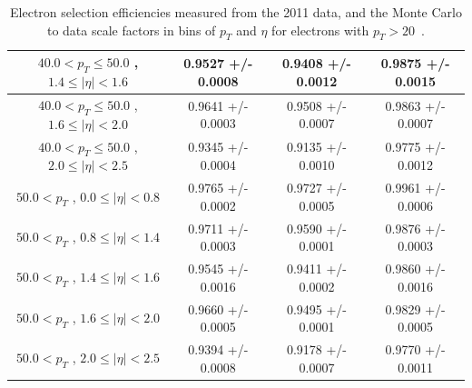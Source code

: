 \documentclass{cmspaper}
\begin{document}
\begin{table}[!ht]
\begin{center}
\begin{tabular}{|c|c|c|c|}
\hline
$ 40.0 < p_{T} \le  50.0$ , $  1.4  \le |\eta| <   1.6$   &       0.9527 +/- 0.0008   &       0.9408 +/- 0.0012   &       0.9875 +/- 0.0015   \\   
\hline
$ 40.0 < p_{T} \le  50.0$ , $  1.6  \le |\eta| <   2.0$   &       0.9641 +/- 0.0003   &       0.9508 +/- 0.0007   &       0.9863 +/- 0.0007   \\   
\hline
$ 40.0 < p_{T} \le  50.0$ , $  2.0  \le |\eta| <   2.5$   &       0.9345 +/- 0.0004   &       0.9135 +/- 0.0010   &       0.9775 +/- 0.0012   \\   
\hline
$ 50.0 < p_{T} $ , $  0.0  \le |\eta| <   0.8$   &       0.9765 +/- 0.0002   &       0.9727 +/- 0.0005   &       0.9961 +/- 0.0006   \\   
\hline
$ 50.0 < p_{T} $ , $  0.8  \le |\eta| <   1.4$   &       0.9711 +/- 0.0003   &       0.9590 +/- 0.0001   &       0.9876 +/- 0.0003   \\   
\hline
$ 50.0 < p_{T} $ , $  1.4  \le |\eta| <   1.6$   &       0.9545 +/- 0.0016   &       0.9411 +/- 0.0002   &       0.9860 +/- 0.0016   \\   
\hline
$ 50.0 < p_{T} $ , $  1.6  \le |\eta| <   2.0$   &       0.9660 +/- 0.0005   &       0.9495 +/- 0.0001   &       0.9829 +/- 0.0005   \\   
\hline
$ 50.0 < p_{T} $ , $  2.0  \le |\eta| <   2.5$   &       0.9394 +/- 0.0008   &       0.9178 +/- 0.0007   &       0.9770 +/- 0.0011   \\   
\hline
\end{tabular}
\caption{Electron selection efficiencies measured from the 2011 data, and the Monte Carlo to data
scale factors in bins of $p_{T}$ and $\eta$ for electrons with $p_{T}>20$~\GeV.}
\label{tab:eff_ele_selection_highpt}
\end{center}
\end{table}
\end{document}
